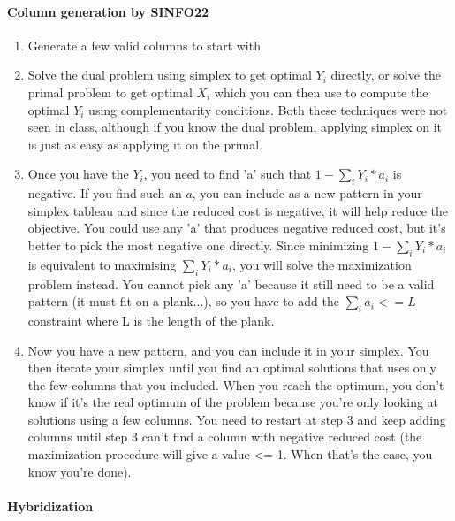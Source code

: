 \paragraph{Column generation by SINFO22}
\begin{enumerate}
    \item Generate a few valid columns to start with

    \item  Solve the dual problem using simplex to get optimal $Y_i$ directly,
        or solve the primal problem to get optimal $X_i$ which you can then
        use to compute the optimal $Y_i$ using complementarity conditions.
        Both these techniques were not seen in class, although if you know
        the dual problem, applying simplex on it is just as easy as applying
        it on the primal.

    \item  Once you have the $Y_i$, you need to find 'a' such that $1 - \sum_i
        Y_i * a_i$ is negative. If you find such an $a$, you can include as a
        new pattern in your simplex tableau and since the reduced cost is
        negative, it will help reduce the objective. You could use any 'a'
        that produces negative reduced cost, but it's better to pick the
        most negative one directly. Since minimizing $1-\sum_i Y_i*a_i$ is
        equivalent to maximising $\sum_i Y_i * a_i$, you will solve the
        maximization problem instead. You cannot pick any 'a' because it
        still need to be a valid pattern (it must fit on a plank...), so you
        have to add the $\sum_i a_i <= L$ constraint where L is the length of
        the plank.

    \item  Now you have a new pattern, and you can include it in your
        simplex. You then iterate your simplex until you find an optimal
        solutions that uses only the few columns that you included. When you
        reach the optimum, you don't know if it's the real optimum of the
        problem because you're only looking at solutions using a few
        columns. You need to restart at step 3 and keep adding columns until
        step 3 can't find a column with negative reduced cost (the
        maximization procedure will give a value <= 1. When that's the case,
        you know you're done).
\end{enumerate}

\paragraph{Hybridization}

